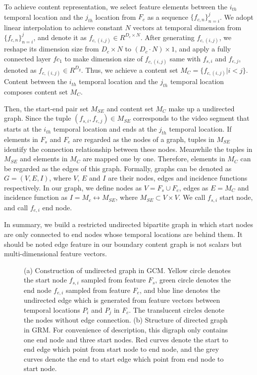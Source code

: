 \documentclass[runningheads]{llncs}
\begin{document}
To achieve content representation, we select feature elements between the $i_{th}$ temporal location and the $j_{th}$ location from $F_c$ as a sequence $\{f_{c,n}\}_{n=i}^{j}$. We adopt linear interpolation to achieve constant $N$ vectors at temporal dimension from $\{f_{c,n}\}_{n=i}^{j}$, and denote it as $f_{c,(i,j)} \in R^{D_c \times N}$. After generating $f_{c,(i,j)}$, we reshape its dimension size from ${D_c \times N}$ to $(D_c \cdot N) \times 1$, and apply a fully connected layer $fc_1$ to make dimension size of $f_{c,(i,j)}$ same with $f_{s,i}$ and $f_{e,j}$, denoted as $f_{c,(i,j)} \in R^{D_g}$. Thus, we achieve a content set $M_C = \{f_{c,(i,j)}|i<j\}$. Content between the $i_{th}$ temporal location and the $j_{th}$ temporal location composes content set $M_C$.

Then, the start-end pair set $M_{SE}$ and content set $M_C$ make up a undirected graph. Since the tuple $(f_{s,i}, f_{e,j}) \in M_{SE}$ corresponds to the video segment that starts at the $i_{th}$ temporal location and ends at the $j_{th}$ temporal location. If elements in $F_s$ and $F_e$ are regarded as the nodes of a graph, tuples in $M_{SE}$ identify the connection relationship between these nodes. Meanwhile the tuples in $ M_{SE}$ and elements in $M_C$ are mapped one by one. Therefore, elements in $M_C$ can be regarded as the edges of this graph. Formally, graphs can be denoted as $G=(V,E,I)$, where $V$, $E$ and $I$ are their nodes, edges and incidence functions respectively. In our graph, we define nodes as $V = F_s \cup F_e$, edges as $E = M_C$ and incidence function as $I = M_c \leftrightarrow M_{SE}$, where $M_{SE} \subset V \times V $. We call $f_{s,i}$ start node, and call $f_{e,i}$ end node. 

In summary, we build a restricted undirected bipartite graph in which start nodes are only connected to end nodes whose temporal locations are behind them. It should be noted edge feature in our boundary content graph is not scalars but multi-dimensional feature vectors.


\begin{figure}
\centering
\setlength{\belowcaptionskip}{-0.cm}
\quad\quad\quad\quad
{}

\caption{(a) Construction of undirected graph in GCM. Yellow circle denotes the start node $f_{s,i}$ sampled from feature $F_s$, green circle denotes the end node $f_{e,i}$ sampled from feature $F_e$, and blue line denotes the undirected edge which is generated from feature vectors between temporal locations $P_i$ and $P_j$ in $F_c$. The translucent circles denote the nodes without edge connection.
 (b) Structure of directed graph in GRM. For convenience of description, this digraph only contains one end node and three start nodes. Red curves denote the start to end edge which point from start node to end node, and the grey curves denote the end to start edge which point from end node to start node. }

\end{figure}
\end{document}
